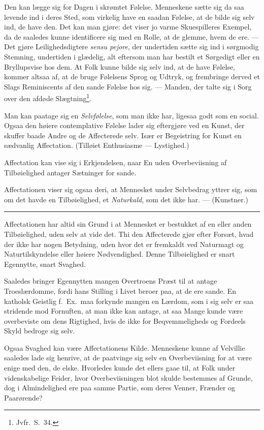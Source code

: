 \documentclass[12pt]{article}
\newcommand{\opage}[1]{\marginnote{\footnotesize\textit{[#1]}}}
\newcommand{\ombreak}{\par\medskip\begin{center}\rule{0.32\textwidth}{0.4pt}\end{center}\medskip}
\begin{document}
Den kan lægge sig for Dagen i skrømtet Følelse. Menneskene sætte sig da saa levende ind i deres Sted, som virkelig have en saadan Følelse, at de bilde sig selv ind, de have den. Det kan man gjøre: det viser jo varme Skuespilleres Exempel, da de saaledes kunne identificere sig med en Rolle, at de glemme, hvem de ere. --- Det gjøre Leilighedsdigtere \emph{sensu pejore}, der undertiden sætte sig ind i sørgmodig Stemning, undertiden i glædelig, alt eftersom man har bestilt et Sørgedigt eller en Bryllupsvise hos dem. At Folk kunne bilde sig selv ind, at de have Følelse, kommer altsaa af, at de bruge Følelsens Sprog og Udtryk, og frembringe derved et Slags Reminiscents af den sande Følelse hos sig. --- Manden, der talte sig i Sorg over den afdøde Slægtning\footnote{Jvfr.\ S.\ 34.}.

\opage{174}Man kan paatage sig en \emph{Selvfølelse}, som man ikke har, ligesaa godt som en social. Ogsaa den høiere contemplative Følelse lader sig eftergjøre ved en Kunst, der skuffer baade Andre og de Affecterede selv. Især er Begeistring for Kunst en sædvanlig Affectation. (Tilløiet Enthusiasme --- Lystighed.)

Affectation kan vise sig i Erkjendelsen, naar En uden Overbeviisning af Tilbøielighed antager Sætninger for sande.

Affectationen viser sig ogsaa deri, at Mennesket under Selvbedrag yttrer sig, som om det havde en Tilbøielighed, et \emph{Naturkald}, som det ikke har. --- (Kunstner.)

\ombreak

Affectationen har altid sin Grund i at Mennesket er bestukket af en eller anden Tilbøielighed, uden selv at vide det. Thi den Affecterede gjør efter Forsæt, hvad der ikke har nogen Betydning, uden hvor det er fremkaldt ved Naturmagt og Naturtilskyndelse eller høiere Nødvendighed. Denne Tilbøielighed er snart Egennytte, snart Svaghed.

Saaledes bringer Egennytten mangen Overtroens Præst til at antage Troeslærdomme, fordi hans Stilling i Livet beroer paa, at de ere sande. En katholsk Geistlig f.\ Ex.\ maa forkynde mangen en Lærdom, som i sig selv er saa stridende mod Fornuften, at man ikke kan antage, at saa Mange kunde være overbeviste om dens Rigtighed, hvis de ikke for Beqvemmeligheds og Fordeels Skyld bedroge sig selv.

Ogsaa Svaghed kan være Affectationens Kilde. Menneskene kunne af Velvillie saaledes lade sig henrive, at de paatvinge sig selv en Overbeviisning for at være enige med den, de elske. Hvorledes kunde det ellers gaae til, at Folk under videnskabelige Feider, hvor Overbeviisningen blot skulde bestemmes af Grunde, dog i Almindelighed ere paa samme Partie, som deres Venner, Frænder og Paarørende?
\end{document}
